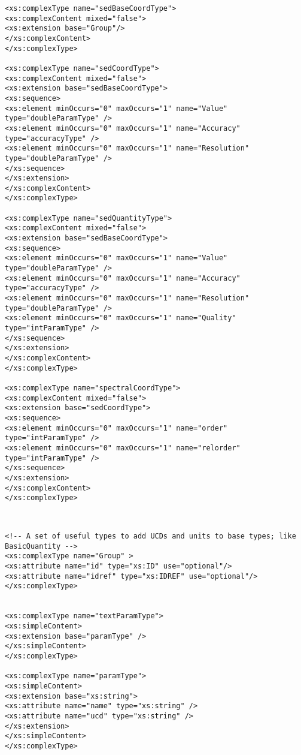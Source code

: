 {\begin{flushleft}
\begin{fmppage}
\begin{verbatim}
<xs:complexType name="sedBaseCoordType">
<xs:complexContent mixed="false">
<xs:extension base="Group"/>
</xs:complexContent>
</xs:complexType>

<xs:complexType name="sedCoordType">
<xs:complexContent mixed="false">
<xs:extension base="sedBaseCoordType">
<xs:sequence>
<xs:element minOccurs="0" maxOccurs="1" name="Value" type="doubleParamType" />
<xs:element minOccurs="0" maxOccurs="1" name="Accuracy" type="accuracyType" />
<xs:element minOccurs="0" maxOccurs="1" name="Resolution" type="doubleParamType" />
</xs:sequence>
</xs:extension>
</xs:complexContent>
</xs:complexType>

<xs:complexType name="sedQuantityType">
<xs:complexContent mixed="false">
<xs:extension base="sedBaseCoordType">
<xs:sequence>
<xs:element minOccurs="0" maxOccurs="1" name="Value" type="doubleParamType" />
<xs:element minOccurs="0" maxOccurs="1" name="Accuracy" type="accuracyType" />
<xs:element minOccurs="0" maxOccurs="1" name="Resolution" type="doubleParamType" />
<xs:element minOccurs="0" maxOccurs="1" name="Quality" type="intParamType" />
</xs:sequence>
</xs:extension>
</xs:complexContent>
</xs:complexType>

<xs:complexType name="spectralCoordType">
<xs:complexContent mixed="false">
<xs:extension base="sedCoordType">
<xs:sequence>
<xs:element minOccurs="0" maxOccurs="1" name="order" type="intParamType" />
<xs:element minOccurs="0" maxOccurs="1" name="relorder" type="intParamType" />
</xs:sequence>
</xs:extension>
</xs:complexContent>
</xs:complexType>


\end{verbatim}
\end{fmppage}

\begin{fmppage}
\begin{verbatim}

<!-- A set of useful types to add UCDs and units to base types; like BasicQuantity -->
<xs:complexType name="Group" >
<xs:attribute name="id" type="xs:ID" use="optional"/>
<xs:attribute name="idref" type="xs:IDREF" use="optional"/>
</xs:complexType>


<xs:complexType name="textParamType">
<xs:simpleContent>
<xs:extension base="paramType" />
</xs:simpleContent>
</xs:complexType>

<xs:complexType name="paramType">
<xs:simpleContent>
<xs:extension base="xs:string">
<xs:attribute name="name" type="xs:string" />
<xs:attribute name="ucd" type="xs:string" />
</xs:extension>
</xs:simpleContent>
</xs:complexType>


\end{verbatim}
\end{fmppage}
\end{flushleft}}
